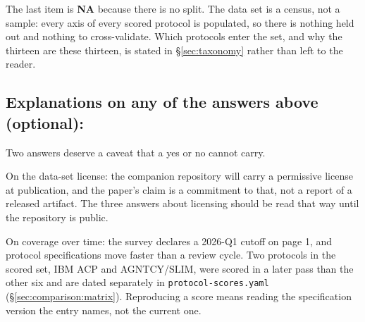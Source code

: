 The last item is \textbf{NA} because there is no split. The data set is a
census, not a sample: every axis of every scored protocol is populated, so
there is nothing held out and nothing to cross-validate. Which protocols
enter the set, and why the thirteen are these thirteen, is stated in
\S\ref{sec:taxonomy} rather than left to the reader.

\subsection*{Explanations on any of the answers above (optional):}

Two answers deserve a caveat that a yes or no cannot carry.

On the data-set license: the companion repository will carry a permissive
license at publication, and the paper's claim is a commitment to that, not a
report of a released artifact. The three answers about licensing should be
read that way until the repository is public.

On coverage over time: the survey declares a 2026-Q1 cutoff on page 1, and
protocol specifications move faster than a review cycle. Two protocols in the
scored set, IBM ACP and AGNTCY/SLIM, were scored in a later pass than the
other six and are dated separately in \texttt{protocol-scores.yaml}
(\S\ref{sec:comparison:matrix}). Reproducing a score means reading the
specification version the entry names, not the current one.
